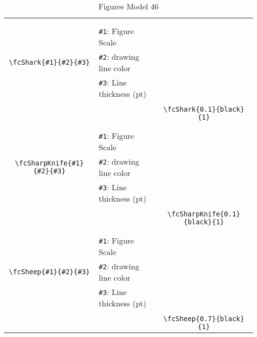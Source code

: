 \documentclass[x11names]{article}
\begin{document}
\begin{table}[H]
\begin{tabular}{|c|l|c|}
	&&\multirow{5}{*}{\fcShark{0.1}{black}{1}}\\	&&\\	&\verb|#1|: Figure Scale &\\	\verb|\fcShark{#1}{#2}{#3}|&	\verb|#2|: drawing line color &\\	&\verb|#3|: Line thickness (pt) &\\ &&\\&&	\verb|\fcShark{0.1}{black}{1}|\\\hline 	
	&&\multirow{5}{*}{\fcSharpKnife{0.1}{black}{1}}\\	&&\\	&\verb|#1|: Figure Scale &\\	\verb|\fcSharpKnife{#1}{#2}{#3}|&	\verb|#2|: drawing line color &\\	&\verb|#3|: Line thickness (pt) &\\ &&\\&&	\verb|\fcSharpKnife{0.1}{black}{1}|\\\hline 	
	&&\multirow{5}{*}{\fcSheep{0.7}{black}{1}}\\	&&\\	&\verb|#1|: Figure Scale &\\	\verb|\fcSheep{#1}{#2}{#3}|&	\verb|#2|: drawing line color &\\	&\verb|#3|: Line thickness (pt) &\\ &&\\&&	\verb|\fcSheep{0.7}{black}{1}|\\\hline 	\hline\end{tabular}\caption{Figures Model 46}\label{tab46}\end{table}
\end{document}
